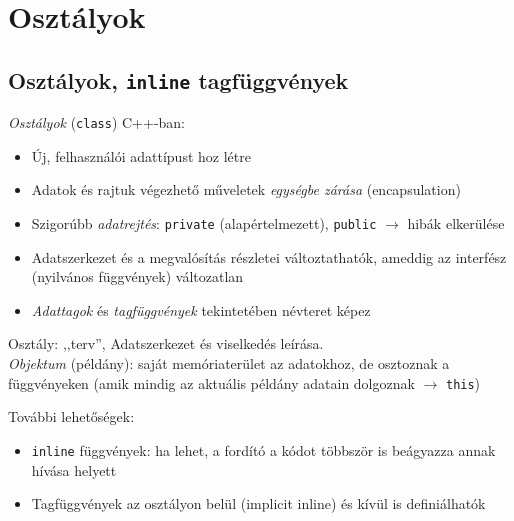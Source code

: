 \documentclass[usenames,dvipsnames,aspectratio=169]{beamer}
\begin{document}
\section{Osztályok}

\subsection{Osztályok, \texttt{inline} tagfüggvények}

\begin{frame}
    \emph{Osztályok} (\texttt{class}) C++-ban:
    \begin{itemize}
        \item Új, felhasználói adattípust hoz létre
        \item Adatok és rajtuk végezhető műveletek \emph{egységbe zárása} (encapsulation)
        \item Szigorúbb \emph{adatrejtés}: \texttt{private} (alapértelmezett), \texttt{public} $\to$ hibák elkerülése
        \item Adatszerkezet és a megvalósítás részletei változtathatók, ameddig az interfész (nyilvános függvények) változatlan
        \item \emph{Adattagok} és \emph{tagfüggvények} tekintetében névteret képez
    \end{itemize}
    \vfill
    Osztály: ,,terv'',  Adatszerkezet és viselkedés leírása. \\
    \emph{Objektum} (példány): saját memóriaterület az adatokhoz, de osztoznak a függvényeken (amik mindig az aktuális példány adatain dolgoznak $\to$ \texttt{this})
\end{frame}

\begin{frame}
    További lehetőségek:
    \begin{itemize}
        \item \texttt{inline} függvények: ha lehet, a fordító a kódot többször is beágyazza annak hívása helyett
        \item Tagfüggvények az osztályon belül (implicit inline) és kívül is definiálhatók
    \end{itemize}    
\end{frame}

\begin{frame}
    \begin{exampleblock}{}
        \footnotesize
        
    \end{exampleblock}
\end{frame}
\end{document}
